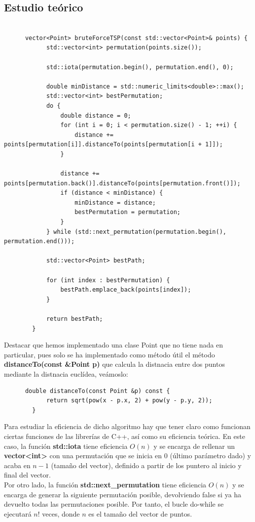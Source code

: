 \documentclass[11pt,openany]{book}
\begin{document}
\subsection{Estudio teórico}
\begin{lstlisting}

      vector<Point> bruteForceTSP(const std::vector<Point>& points) {
            std::vector<int> permutation(points.size());
      
            std::iota(permutation.begin(), permutation.end(), 0);
        
            double minDistance = std::numeric_limits<double>::max();
            std::vector<int> bestPermutation;
            do {
                double distance = 0;
                for (int i = 0; i < permutation.size() - 1; ++i) {
                    distance += points[permutation[i]].distanceTo(points[permutation[i + 1]]);
                }
        
                distance += points[permutation.back()].distanceTo(points[permutation.front()]);
                if (distance < minDistance) {
                    minDistance = distance;
                    bestPermutation = permutation;
                }
            } while (std::next_permutation(permutation.begin(), permutation.end()));
        
            std::vector<Point> bestPath;
        
            for (int index : bestPermutation) {
                bestPath.emplace_back(points[index]);
            }
        
            return bestPath;
        }
\end{lstlisting}
Destacar que hemos implementado una clase Point que no tiene nada en particular, pues solo se ha implementado
como método útil el método \textbf{distanceTo(const \&Point p)} que calcula la distnacia entre dos puntos
mediante la distnacia euclídea, veámoslo:
\begin{lstlisting}
      double distanceTo(const Point &p) const {
            return sqrt(pow(x - p.x, 2) + pow(y - p.y, 2));
        }
\end{lstlisting}
Para estudiar la eficiencia de dicho algoritmo hay que tener claro como funcionan ciertas funciones de las librerías de C++, así como
su eficiencia teórica. En este caso, la función \textbf{std::iota} tiene eficiencia $O(n)$ y se encarga de rellenar un \textbf{vector<int>}
con una permutación que se inicia en $0$ (último parámetro dado) y acaba en $n-1$ (tamaño del vector), definido a partir de los puntero al inicio
y final del vector. \\
Por otro lado, la función \textbf{std::next\_permutation} tiene eficiencia $O(n)$ y se encarga de generar la siguiente permutación posible, devolviendo
 false si ya ha devuelto todas las permutaciones posible. Por tanto, el bucle do-while se ejecutará $n!$ veces, donde $n$ es el tamaño del vector de puntos. \\ \\
\end{document}
